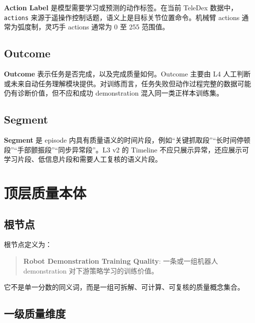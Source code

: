\documentclass[UTF8,zihao=-4,oneside,openany]{ctexrep}
\newcommand{\Code}[1]{\texttt{#1}}
\newcommand{\Term}[1]{\textbf{#1}}
\begin{document}
\Term{Action Label} 是模型需要学习或预测的动作标签。在当前 TeleDex 数据中，\Code{actions} 来源于遥操作控制话题，语义上是目标关节位置命令。机械臂 actions 通常为弧度制，灵巧手 actions 通常为 0 至 255 范围值。

\subsection{Outcome}

\Term{Outcome} 表示任务是否完成，以及完成质量如何。Outcome 主要由 L4 人工判断或未来自动任务理解模块提供。对训练而言，任务失败但动作过程完整的数据可能仍有诊断价值，但不应和成功 demonstration 混入同一类正样本训练集。

\subsection{Segment}

\Term{Segment} 是 episode 内具有质量语义的时间片段，例如“关键抓取段”“长时间停顿段”“手部颤振段”“同步异常段”。L3 v2 的 Timeline 不应只展示异常，还应展示可学习片段、低信息片段和需要人工复核的语义片段。

\section{顶层质量本体}

\subsection{根节点}

根节点定义为：
\begin{quote}
\Term{Robot Demonstration Training Quality}: 一条或一组机器人 demonstration 对下游策略学习的训练价值。
\end{quote}

它不是单一分数的同义词，而是一组可拆解、可计算、可复核的质量概念集合。

\subsection{一级质量维度}
\end{document}
